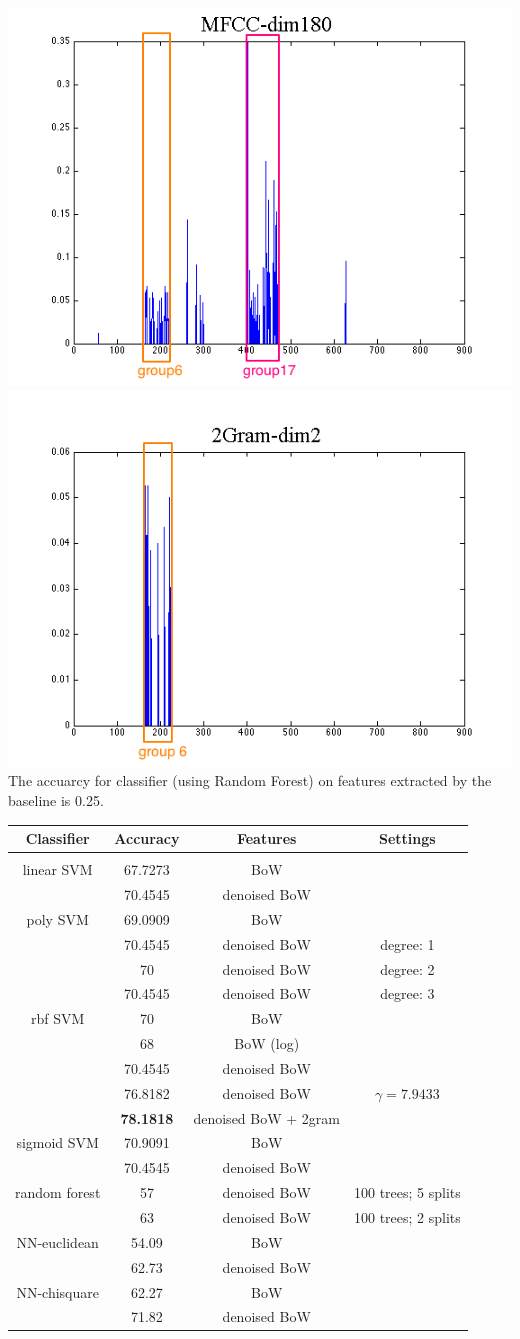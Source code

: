 
\includegraphics[width=0.18 \linewidth]{./images/mfcc_180.png}
\includegraphics[width=0.19 \linewidth]{./images/ngram_202.png}\\
\footnotesize
The accuarcy for classifier (using Random Forest) on features extracted by the baseline is 0.25. 


\begin{tabular}{cccc}
\multicolumn{1}{c}{\bf Classifier }&\multicolumn{1}{c}{\bf Accuracy}  &\multicolumn{1}{c}{\bf Features} &\multicolumn{1}{c}{\bf Settings}
\\ \hline \\
linear SVM		&67.7273 		&BoW 		&  \\
			& 70.4545  	& denoised BoW 	&  \\
poly SVM		&69.0909		&BoW 		&  \\
			& 70.4545  	& denoised BoW 	& degree: 1  \\
			& 70 			& denoised BoW 	& degree: 2  \\
			& 70.4545  	& denoised BoW 	& degree: 3  \\
rbf SVM       	&70 			&BoW 		&  \\
                     	&68  			&  BoW (log) 	&  \\
          		&70.4545  		&  denoised BoW 	&  \\
          		&76.8182  		&  denoised BoW 	&  $\gamma = 7.9433$ \\
          		&{\bf 78.1818}  	&  denoised BoW + 2gram 	&    \\
sigmoid SVM     	&70.9091		&BoW 		&  \\
       			&70.4545  		& denoised BoW 	&  \\
random forest    	&57			& denoised BoW	& 100 trees; 5 splits \\
       			&63  			& denoised BoW 	& 100 trees; 2 splits \\
NN-euclidean   	&54.09		& BoW	&  \\
       			&62.73		& denoised BoW 	&  \\
NN-chisquare	&62.27		& BoW	&  \\
       			&71.82		& denoised BoW 	& \\

\end{tabular}


